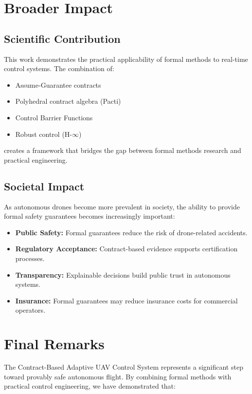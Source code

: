 \section{Broader Impact}

\subsection{Scientific Contribution}

This work demonstrates the practical applicability of formal methods to real-time control systems. The combination of:
\begin{itemize}
    \item Assume-Guarantee contracts
    \item Polyhedral contract algebra (Pacti)
    \item Control Barrier Functions
    \item Robust control (H-$\infty$)
\end{itemize}
creates a framework that bridges the gap between formal methods research and practical engineering.

\subsection{Societal Impact}

As autonomous drones become more prevalent in society, the ability to provide formal safety guarantees becomes increasingly important:

\begin{itemize}
    \item \textbf{Public Safety:} Formal guarantees reduce the risk of drone-related accidents.
    \item \textbf{Regulatory Acceptance:} Contract-based evidence supports certification processes.
    \item \textbf{Transparency:} Explainable decisions build public trust in autonomous systems.
    \item \textbf{Insurance:} Formal guarantees may reduce insurance costs for commercial operators.
\end{itemize}

\section{Final Remarks}

The Contract-Based Adaptive UAV Control System represents a significant step toward provably safe autonomous flight. By combining formal methods with practical control engineering, we have demonstrated that:

